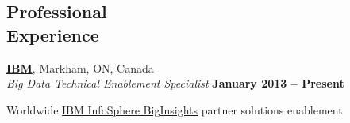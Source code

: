 \documentclass[margin,line]{resume}
\begin{document}
\begin{resume}
\section{\mysidestyle Professional\\Experience}

	\textbf{\href{http://www.ibm.com/}{IBM}}, Markham, ON, Canada					\vspace{2mm}\\\vspace{1mm}
	\textsl{Big Data Technical Enablement Specialist}	\hfill\textbf{January 2013 -- Present}		\\\vspace{-3mm}
	\begin{list2}
		\item Worldwide \href{http://www.ibm.com/software/data/infosphere/biginsights}{IBM InfoSphere BigInsights} partner solutions enablement
	\end{list2}


\end{resume}
\end{document}
